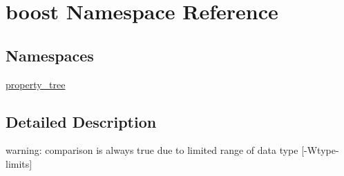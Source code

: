\hypertarget{namespaceboost}{}\section{boost Namespace Reference}
\label{namespaceboost}
\subsection*{Namespaces}
\begin{DoxyCompactItemize}
\item 
 \hyperlink{namespaceboost_1_1property__tree}{property\+\_\+tree}
\end{DoxyCompactItemize}


\subsection{Detailed Description}
warning\+: comparison is always true due to limited range of data type \mbox{[}-\/\+Wtype-\/limits\mbox{]} 